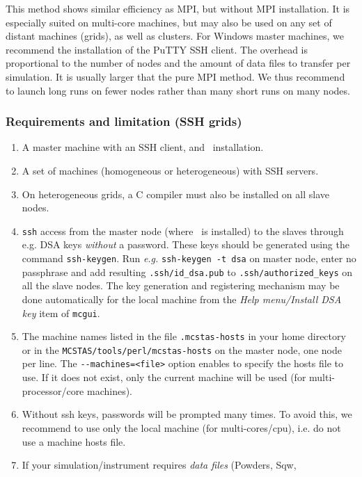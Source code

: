 This method shows similar efficiency as MPI, but without MPI installation. It is
especially suited on multi-core machines, but may also be used on any set of
distant machines (grids), as well as clusters. For Windows master machines, we
recommend the installation of the PuTTY SSH client. The overhead is proportional
to the number of nodes and the amount of data files to transfer per
simulation. It is usually larger that the pure MPI method. We thus recommend to
launch long runs on fewer nodes rather than many short runs on many nodes.

\subsubsection{Requirements and limitation (SSH grids)}

  \begin{enumerate}
  \item{A master machine with an SSH client, and \MCS\ installation.}
  \item{A set of machines (homogeneous or heterogeneous) with SSH servers.}
  \item{On heterogeneous grids, a C compiler must also be installed on all slave
      nodes.}
  \item{\texttt{ssh} access from the master node (where \MCS\ is
      installed) to the slaves through e.g. DSA keys \emph{without} a
      password. These keys should be generated using the command
      \texttt{ssh-keygen}. Run \emph{e.g.} \texttt{ssh-keygen -t dsa} on
      master node, enter no passphrase and add resulting
      \texttt{.ssh/id\_dsa.pub} to \texttt{.ssh/authorized\_keys}
      on all the slave nodes. The key generation and registering mechanism
      may be done automatically for the local machine from the
      \emph{Help menu/Install DSA key} item of \verb+mcgui+.}
  \item{The machine names listed in the file \texttt{.mcstas-hosts} in
      your home directory or in the \texttt{MCSTAS/tools/perl/mcstas-hosts} on
      the master node, one node per line. The \verb'--machines=<file>' option
      enables to specify the hosts file to use. If it does not exist, only
      the current machine will be used (for multi-processor/core machines).}
  \item{Without ssh keys, passwords will be prompted many times. To avoid this,
      we recommend to use only the local machine (for multi-cores/cpu), i.e. do
      not use a machine hosts file.}
  \item{If your simulation/instrument requires \emph{data files} (Powders, Sqw,
}
\end{enumerate}
